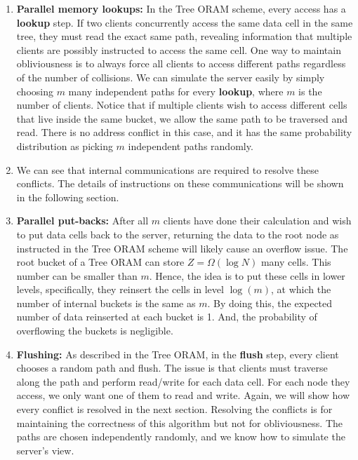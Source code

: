 \documentclass[fontsize=11pt]{article}
\begin{document}
\begin{enumerate}
    \item \textbf{Parallel memory lookups:} In the Tree ORAM scheme, every access has a \textbf{lookup} step. If two clients concurrently access the same data cell in the same tree, they must read the exact same path, revealing information that multiple clients are possibly instructed to access the same cell. One way to maintain obliviousness is to always force all clients to access different paths regardless of the number of collisions. We can simulate the server easily by simply choosing $m$ many independent paths for every \textbf{lookup}, where $m$ is the number of clients. Notice that if multiple clients wish to access different cells that live inside the same bucket, we allow the same path to be traversed and read. There is no address conflict in this case, and it has the same probability distribution as picking $m$ independent paths randomly.
    \item We can see that internal communications are required to resolve these conflicts. The details of instructions on these communications will be shown in the following section.
    \item \textbf{Parallel put-backs: }After all $m$ clients have done their calculation and wish to put data cells back to the server, returning the data to the root node as instructed in the Tree ORAM scheme will likely cause an overflow issue. The root bucket of a Tree ORAM can store $Z = \Omega(\log N)$ many cells. This number can be smaller than $m$. Hence, the idea is to put these cells in lower levels, specifically, they reinsert the cells in level $\log(m)$, at which the number of internal buckets is the same as $m$. By doing this, the expected number of data reinserted at each bucket is 1. And, the probability of overflowing the buckets is negligible.
    \item \textbf{Flushing:} As described in the Tree ORAM, in the \textbf{flush} step, every client chooses a random path and flush. The issue is that clients must traverse along the path and perform read/write for each data cell. For each node they access, we only want one of them to read and write. Again, we will show how every conflict is resolved in the next section. Resolving the conflicts is for maintaining the correctness of this algorithm but not for obliviousness. The paths are chosen independently randomly, and we know how to simulate the server's view. 
\end{enumerate}
\end{document}
